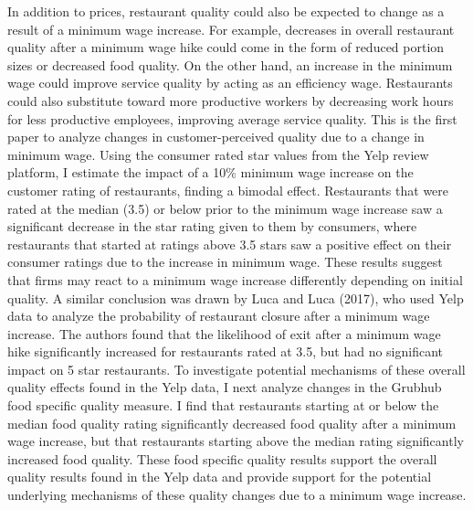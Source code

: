 \documentclass[11pt]{article}
\begin{document}
In addition to prices, restaurant quality could also be expected to change as a result of a minimum wage increase. For example, decreases in overall restaurant quality after a minimum wage hike could come in the form of reduced portion sizes or decreased food quality. On the other hand, an increase in the minimum wage could improve service quality by acting as an efficiency wage. Restaurants could also substitute toward more productive workers by decreasing work hours for less productive employees, improving average service quality. This is the first paper to analyze changes in customer-perceived quality due to a change in minimum wage. Using the consumer rated star values from the Yelp review platform, I estimate the impact of a 10\% minimum wage increase on the customer rating of restaurants, finding a bimodal effect. %
Restaurants that were rated at the median (3.5) or below prior to the minimum wage increase saw a significant decrease in the star rating given to them by consumers, where restaurants that started at ratings above 3.5 stars saw a positive effect on their consumer ratings due to the increase in minimum wage. These results suggest that firms may react to a minimum wage increase differently depending on initial quality. A similar conclusion was drawn by Luca and Luca (2017), who used Yelp data to analyze the probability of restaurant closure after a minimum wage increase. The authors found that the 
likelihood of exit after a minimum wage hike significantly increased for restaurants rated at 3.5, but had no significant impact on 5 star restaurants\nocite{luca2017survival}. To investigate potential mechanisms of these overall quality effects found in the Yelp data, I next analyze changes in the Grubhub food specific quality measure. I find that restaurants starting at or below the median food quality rating significantly decreased food quality after a minimum wage increase, but that restaurants starting above the median rating significantly increased food quality. These food specific quality results support the overall quality results found in the Yelp data and provide support for the potential underlying mechanisms of these quality changes due to a minimum wage increase.

\end{document}

